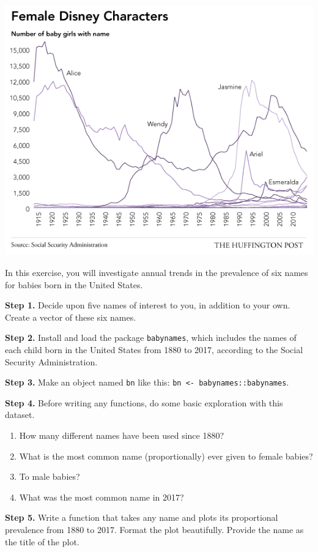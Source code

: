 \documentclass[
]{book}
\providecommand{\tightlist}{%
  \setlength{\itemsep}{0pt}\setlength{\parskip}{0pt}}
\begin{document}
\includegraphics{img/baby_names.png}

In this exercise, you will investigate annual trends in the prevalence of six names for babies born in the United States.

\textbf{Step 1.} Decide upon five names of interest to you, in addition to your own. Create a vector of these six names.

\textbf{Step 2.} Install and load the package \texttt{babynames}, which includes the names of each child born in the United States from 1880 to 2017, according to the Social Security Administration.

\textbf{Step 3.} Make an object named \texttt{bn} like this: \texttt{bn\ \textless{}-\ babynames::babynames}.

\textbf{Step 4.} Before writing any functions, do some basic exploration with this dataset.

\begin{enumerate}
\def\labelenumi{(\alph{enumi})}
\tightlist
\item
  How many different names have been used since 1880?\\
\item
  What is the most common name (proportionally) ever given to female babies?
\item
  To male babies?
\item
  What was the most common name in 2017?
\end{enumerate}

\textbf{Step 5.} Write a function that takes any name and plots its proportional prevalence from 1880 to 2017. Format the plot beautifully. Provide the name as the title of the plot.
\end{document}
